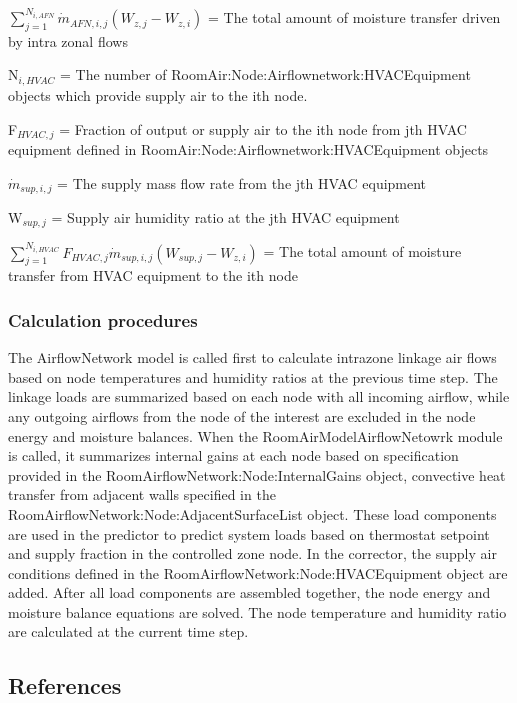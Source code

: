 \({\sum\limits_{j = 1}^{N_{i,AFN}} \dot m_{AFN,i,j} \left( W_{z,j} - W_{z,i}\right)}\) = The total amount of moisture transfer driven by intra zonal flows

N\(_{i,HVAC}\) = The number of RoomAir:Node:Airflownetwork:HVACEquipment objects which provide supply air to the ith node.

F\(_{HVAC,j}\) = Fraction of output or supply air to the ith node from jth HVAC equipment defined in RoomAir:Node:Airflownetwork:HVACEquipment objects

\({\dot m}_{sup,i,j}\) = The supply mass flow rate from the jth HVAC equipment

W\(_{sup,j}\) = Supply air humidity ratio at the jth HVAC equipment

\({\sum\limits_{j = 1}^{N_{i,HVAC}} F_{HVAC,j} \dot m_{sup,i,j} \left( W_{sup,j} - W_{z,i}\right)}\) = The total amount of moisture transfer from HVAC equipment to the ith node

\subsubsection{Calculation procedures}\label{calculation-procedures}

The AirflowNetwork model is called first to calculate intrazone linkage air flows based on node temperatures and humidity ratios at the previous time step. The linkage loads are summarized based on each node with all incoming airflow, while any outgoing airflows from the node of the interest are excluded in the node energy and moisture balances. When the RoomAirModelAirflowNetowrk module is called, it summarizes internal gains at each node based on specification provided in the RoomAirflowNetwork:Node:InternalGains object, convective heat transfer from adjacent walls specified in the RoomAirflowNetwork:Node:AdjacentSurfaceList object. These load components are used in the predictor to predict system loads based on thermostat setpoint and supply fraction in the controlled zone node. In the corrector, the supply air conditions defined in the RoomAirflowNetwork:Node:HVACEquipment object are added. After all load components are assembled together, the node energy and moisture balance equations are solved. The node temperature and humidity ratio are calculated at the current time step.

\subsection{References}\label{ra-references}

